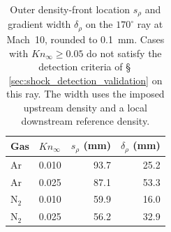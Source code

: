 \begin{table}
\centering
\caption{Outer density-front location \(s_\rho\) and gradient width
\(\delta_\rho\) on the \(170^\circ\) ray at Mach~10, rounded to 0.1~mm. Cases
with \(Kn_\infty\geq0.05\) do not satisfy the detection criteria of
\S\,\ref{sec:shock_detection_validation} on this ray. The width uses the
imposed upstream density and a local downstream reference density.}\label{tab:locations}
\begin{tabular}{llrr}\toprule
Gas & \(Kn_\infty\) & \(s_\rho\) (mm) & \(\delta_\rho\) (mm)\\\midrule
Ar & 0.010 & 93.7 & 25.2\\
Ar & 0.025 & 87.1 & 53.3\\
N$_2$ & 0.010 & 59.9 & 16.0\\
N$_2$ & 0.025 & 56.2 & 32.9\\\bottomrule
\end{tabular}
\end{table}

